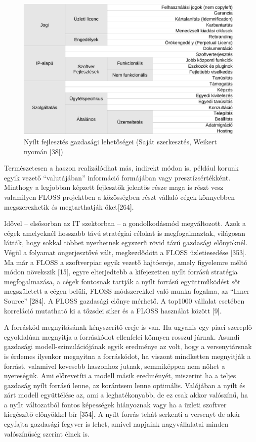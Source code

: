 \documentclass[12pt,magyar,a4paper,oneside]{scrreprt}
\begin{document}
\begin{figure}
\hypertarget{fig:uxdczletiModell}{%
\centering
\includegraphics{ábrák/FLOSS-üzleti-lehetőségek.pdf}
\caption{Nyílt fejlesztés gazdasági lehetőségei (Saját szerkesztés,
Weikert nyomán {[}38{]})}\label{fig:uxdczletiModell}
}
\end{figure}

Természetesen a haszon realizálódhat más, indirekt módon is, például
korunk egyik vezető ``valutájában'' információ formájában vagy
presztízsértékként. Minthogy a legjobban képzett fejlesztők jelentős
része maga is részt vesz valamilyen FLOSS projektben a közösségben részt
vállaló cégek könnyebben megszerezhetik és megtarthatják őket{[}264{]}.

Idővel -- elsősorban az IT szektorban -- a gondolkodásmód megváltozott.
Azok a cégek amelyeknél hosszabb távú stratégiai célokat is
megfogalmaztak, világosan látták, hogy sokkal többet nyerhetnek egyszerű
rövid távú gazdasági előnyöknél. Végül a folyamat öngerjesztővé vált,
megkezdődött a FLOSS üzletiesedése {[}353{]}. Ma már a FLOSS a
szoftverpiac egyik vezető hajtóereje, amely figyelemre méltó módon
növekszik {[}15{]}, egyre elterjedtebb a kifejezetten nyílt forrású
stratégia megfogalmazása, a cégek fontosnak tartják a nyílt forrású
együttműködést sőt megszületett a cégen belüli, FLOSS módszerekkel való
munka fogalma, az ``Inner Source'' {[}284{]}. A FLOSS gazdasági előnye
mérhető. A top1000 vállalat esetében korreláció mutatható ki a tőzsdei
siker és a FLOSS használat között {[}9{]}.

A forráskód megnyitásának kényszerítő ereje is van. Ha ugyanis egy piaci
szereplő egyoldalúan megnyitja a forráskódot ellenfelei könnyen rosszul
járnak. Asundi gazdasági modell-szimulációjának egyik eredménye az volt,
hogy a versenytársnak is érdemes ilyenkor megnyitna a forráskódot, ha
viszont mindketten megnyitják a forrást, valamivel kevesebb haszonhoz
jutnak, semmiképpen nem nőhet a nyereségük. Ami előrevetíti a modell
másik eredményét, miszerint ha a teljes gazdaság nyílt forrású lenne, az
korántsem lenne optimális. Valójában a nyílt és zárt modell együttélése
az, ami a leghatékonyabb, de ez csak akkor valószínű, ha a nyílt
változatból fontos képességek hiányoznak vagy ha a üzleti szoftver
kiegészítő előnyökkel bír {[}354{]}. A nyílt forrás tehát serkenti a
versenyt de akár egyfajta gazdasági fegyver is lehet, amivel napjaink
nagyvállalatai minden valószínűség szerint élnek is.
\end{document}
